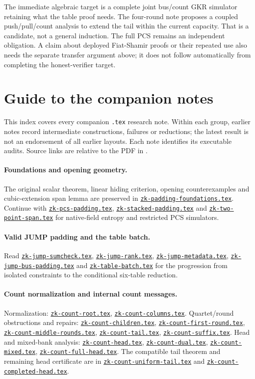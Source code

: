 \documentclass[11pt]{article}
\theoremstyle{definition}
\newcommand{\researchnote}[1]{\href{../#1.tex}{\nolinkurl{#1.tex}}}
\begin{document}
The immediate algebraic target is a complete joint bus/count GKR simulator retaining what the table proof needs. The four-round note proposes a coupled push/pull/count analysis to extend the tail within the current capacity. That is a candidate, not a general induction. The full PCS remains an independent obligation. A claim about deployed Fiat-Shamir proofs or their repeated use also needs the separate transfer argument above; it does not follow automatically from completing the honest-verifier target.

\section{Guide to the companion notes}\label{sec:zk-index}

This index covers every companion \texttt{.tex} research note. Within each group, earlier notes record intermediate constructions, failures or reductions; the latest result is not an endorsement of all earlier layouts. Each note identifies its executable audits. Source links are relative to the PDF in .

\begingroup
\raggedright

\paragraph{Foundations and opening geometry.} The original scalar theorem, linear hiding criterion, opening counterexamples and cubic-extension span lemma are preserved in \researchnote{zk-padding-foundations}. Continue with \researchnote{zk-pcs-padding}, \researchnote{zk-stacked-padding} and \researchnote{zk-two-point-span} for native-field entropy and restricted PCS simulators.

\paragraph{Valid JUMP padding and the table batch.} Read \researchnote{zk-jump-sumcheck}, \researchnote{zk-jump-rank}, \researchnote{zk-jump-metadata}, \researchnote{zk-jump-bus-padding} and \researchnote{zk-table-batch} for the progression from isolated constraints to the conditional six-table reduction.

\paragraph{Count normalization and internal count messages.} Normalization: \researchnote{zk-count-root}, \researchnote{zk-count-columns}. Quartet/round obstructions and repairs: \researchnote{zk-count-children}, \researchnote{zk-count-first-round}, \researchnote{zk-count-middle-rounds}, \researchnote{zk-count-tail}, \researchnote{zk-count-suffix}. Head and mixed-bank analysis: \researchnote{zk-count-head}, \researchnote{zk-count-dual}, \researchnote{zk-count-mixed}, \researchnote{zk-count-full-head}. The compatible tail theorem and remaining head certificate are in \researchnote{zk-count-uniform-tail} and \researchnote{zk-count-completed-head}.
\end{document}
